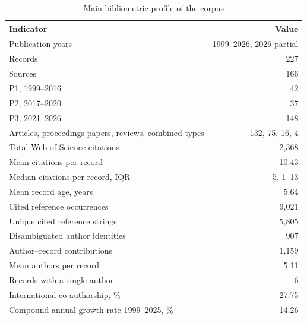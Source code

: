 \begin{table}[!htbp]
\caption{Main bibliometric profile of the corpus}
\label{tab:profile}
\centering
\footnotesize
\begin{tabularx}{\columnwidth}{@{}Yr@{}}
\toprule
Indicator & Value \\
\midrule
Publication years & 1999--2026, 2026 partial \\
Records & 227 \\
Sources & 166 \\
P1, 1999--2016 & 42 \\
P2, 2017--2020 & 37 \\
P3, 2021--2026 & 148 \\
Articles, proceedings papers, reviews, combined types & 132, 75, 16, 4 \\
Total Web of Science citations & 2,368 \\
Mean citations per record & 10.43 \\
Median citations per record, IQR & 5, 1--13 \\
Mean record age, years & 5.64 \\
Cited reference occurrences & 9,021 \\
Unique cited reference strings & 5,805 \\
Disambiguated author identities & 907 \\
Author--record contributions & 1,159 \\
Mean authors per record & 5.11 \\
Records with a single author & 6 \\
International co-authorship, \% & 27.75 \\
Compound annual growth rate 1999--2025, \% & 14.26 \\
\bottomrule
\end{tabularx}
\end{table}
